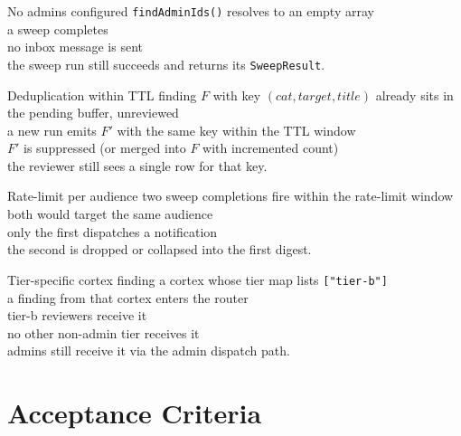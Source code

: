 \begin{scenario}{No admins configured}
\Given \texttt{findAdminIds()} resolves to an empty array \\
\When a sweep completes \\
\Then no inbox message is sent \\
\And the sweep run still succeeds and returns its \texttt{SweepResult}.
\end{scenario}

\begin{scenario}{Deduplication within TTL}
\Given finding $F$ with key $(cat, target, title)$ already sits in the pending buffer, unreviewed \\
\When a new run emits $F'$ with the same key within the TTL window \\
\Then $F'$ is suppressed (or merged into $F$ with incremented count) \\
\And the reviewer still sees a single row for that key.
\end{scenario}

\begin{scenario}{Rate-limit per audience}
\Given two sweep completions fire within the rate-limit window \\
\When both would target the same audience \\
\Then only the first dispatches a notification \\
\And the second is dropped or collapsed into the first digest.
\end{scenario}

\begin{scenario}{Tier-specific cortex finding}
\Given a cortex whose tier map lists \texttt{["tier-b"]} \\
\When a finding from that cortex enters the router \\
\Then tier-b reviewers receive it \\
\And no other non-admin tier receives it \\
\And admins still receive it via the admin dispatch path.
\end{scenario}

\section{Acceptance Criteria}


